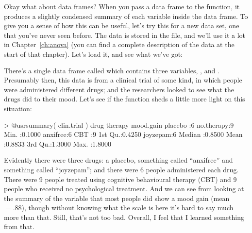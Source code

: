 
Okay what about data frames? When you pass a data frame to the  function, it produces a slightly condensed summary of each variable inside the data frame. To give you a sense of how this can be useful, let's try this for a new data set, one that you've never seen before. The data is stored in the  file, and we'll use it a lot in Chapter~\ref{ch:anova} (you can find a complete description of the data at the start of that chapter). Let's load it, and see what we've got:
There's a single data frame called  which contains three variables, ,  and . Presumably then, this data is from a clinical trial of some kind, in which people were administered different drugs; and the researchers looked to see what the drugs did to their mood. Let's see if the  function sheds a little more light on this situation:
\begin{rblock1}
> @usr{summary( clin.trial )}
       drug         therapy    mood.gain     
 placebo :6   no.therapy:9   Min.   :0.1000  
 anxifree:6   CBT       :9   1st Qu.:0.4250  
 joyzepam:6                  Median :0.8500  
                             Mean   :0.8833  
                             3rd Qu.:1.3000  
                             Max.   :1.8000   
\end{rblock1}
Evidently there were three drugs: a placebo, something called ``anxifree'' and something called ``joyzepam''; and there were 6 people administered each drug. There were 9 people treated using cognitive behavioural therapy (CBT) and 9 people who received no psychological treatment. And we can see from looking at the summary of the  variable that most people did show a mood gain (mean $=.88$), though without knowing what the scale is here it's hard to say much more than that. Still, that's not too bad. Overall, I feel that I learned something from that.




